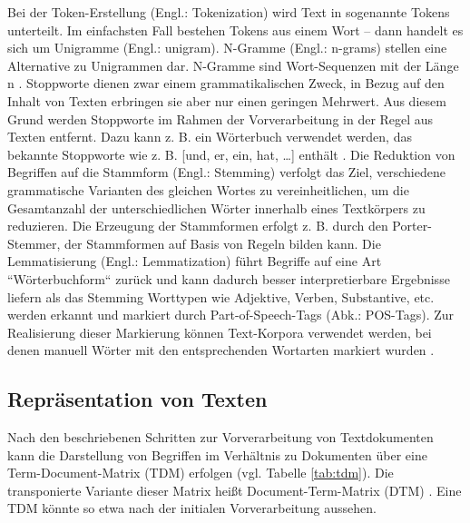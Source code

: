 Bei der Token-Erstellung (Engl.: Tokenization) wird Text in sogenannte Tokens unterteilt. Im einfachsten Fall bestehen Tokens aus einem Wort – dann handelt es sich um Unigramme (Engl.: unigram). N-Gramme (Engl.: n-grams) stellen eine Alternative zu Unigrammen dar. N-Gramme sind Wort-Sequenzen mit der Länge n \cite[S. 48]{Anandarajan}. Stoppworte dienen zwar einem grammatikalischen Zweck, in Bezug auf den Inhalt von Texten erbringen sie aber nur einen geringen Mehrwert. Aus diesem Grund werden Stoppworte im Rahmen der Vorverarbeitung in der Regel aus Texten entfernt. Dazu kann z. B. ein Wörterbuch verwendet werden, das bekannte Stoppworte wie z. B. [und, er, ein, hat, …] enthält \cite[S. 50-53]{Anandarajan}. Die Reduktion von Begriffen auf die Stammform (Engl.: Stemming) verfolgt das Ziel, verschiedene grammatische Varianten des gleichen Wortes zu vereinheitlichen, um die Gesamtanzahl der unterschiedlichen Wörter innerhalb eines Textkörpers zu reduzieren. Die Erzeugung der Stammformen erfolgt z. B. durch den Porter-Stemmer, der Stammformen auf Basis von Regeln bilden kann. Die Lemmatisierung (Engl.: Lemmatization) führt Begriffe auf eine Art ``Wörterbuchform`` zurück und kann dadurch besser interpretierbare Ergebnisse liefern als das Stemming \cite[S. 30-32]{Manning} Worttypen wie Adjektive, Verben, Substantive, etc. werden erkannt und markiert durch Part-of-Speech-Tags (Abk.: POS-Tags). Zur Realisierung dieser Markierung können Text-Korpora verwendet werden, bei denen manuell Wörter mit den entsprechenden Wortarten markiert wurden \cite[S. 58]{Anandarajan}.

\subsection{Repräsentation von Texten} 

Nach den beschriebenen Schritten zur Vorverarbeitung von Textdokumenten kann die Darstellung von Begriffen im Verhältnis zu Dokumenten über eine Term-Document-Matrix (TDM) erfolgen (vgl. Tabelle \ref{tab:tdm}). Die transponierte Variante dieser Matrix heißt Document-Term-Matrix (DTM) \cite[S. 61ff]{Anandarajan}. Eine TDM könnte so etwa nach der initialen Vorverarbeitung aussehen.

